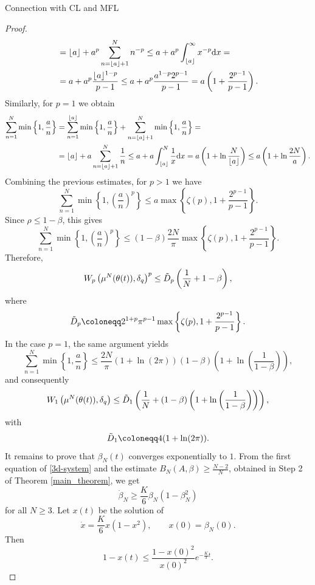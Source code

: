 \documentclass{article}
\theoremstyle{definition}
\newcommand{\jump}{\hfill\break}
\renewcommand{\d}{\textnormal{d}}
\begin{document}
\begin{section}{Connection with CL and MFL}
\begin{proof}
\begin{align*}
           &=\lfloor a\rfloor +a^p\sum_{n=\lfloor a\rfloor+1}^N n^{-p}\leq a+a^p\int_{\lfloor a\rfloor}^\infty x^{-p}\d x=\\
           &=a+a^p\frac{\lfloor a \rfloor^{1-p}}{p-1}\leq a+a^p\frac{a^{1-p}2^{p-1}}{p-1}= a\left(1+\frac{2^{p-1}}{p-1}\right).
        \end{align*}
        Similarly, for $p=1$ we obtain
        \begin{align*}
            \sum_{n=1}^N\min\left\{1,\frac{a}{n}\right\}&=\sum_{n=1}^{\lfloor a\rfloor}\min\left\{1,\frac{a}{n}\right\}+\sum_{n=\lfloor a\rfloor+1}^N\min\left\{1,\frac{a}{n}\right\}=\\
            &=\lfloor a\rfloor +a\sum_{n=\lfloor a\rfloor+1}^N \frac{1}{n}\leq a+a\int_{\lfloor a\rfloor}^N \frac{1}{x}\d x=a\left(1+\ln\frac{N}{\lfloor a\rfloor}\right)\leq a\left(1+\ln\frac{2N}{a}\right).
        \end{align*}
        Combining the previous estimates, for $p>1$ we have
        $$ \sum_{n=1}^N \min\left\{1,\left(\frac{a}{n}\right)^p\right\} \leq a\max\left\{\zeta(p),1+\frac{2^{p-1}}{p-1}\right\}. $$
        Since $\rho\leq1-\beta$, this gives 
        $$ \sum_{n=1}^N \min\left\{1,\left(\frac{a}{n}\right)^p\right\} \leq (1-\beta)\frac{2N}{\pi} \max\left\{\zeta(p),1+\frac{2^{p-1}}{p-1}\right\}. $$
        Therefore,
        $$ W_p\left(\mu^N(\theta(t)),\delta_q\right)^p \leq \Tilde{D}_p \left( \frac{1}{N} + 1-\beta \right), $$
        where
        $$ \Tilde{D}_p\coloneqq 2^{1+p}\pi^{p-1} \max\left\{\zeta(p),1+\frac{2^{p-1}}{p-1}\right\}. $$
        In the case $p=1$, the same argument yields
        $$ \sum_{n=1}^N \min\left\{1,\frac{a}{n}\right\} \leq \frac{2N}{\pi} \left(1+\ln(2\pi)\right) (1-\beta) \left( 1+\ln\left(\frac{1}{1-\beta}\right) \right), $$
        and consequently
        $$ W_1\left(\mu^N(\theta(t)),\delta_q\right) \leq \Tilde{D}_1 \left( \frac{1}{N} + (1-\beta) \left( 1+\ln\left(\frac{1}{1-\beta}\right) \right) \right), $$
        with
        $$ \Tilde{D}_1\coloneqq4(1+\ln(2\pi)). $$\jump\noindent {} It remains to prove that $\beta_N(t)$ converges exponentially to $1$. From the first equation of \eqref{3d-system} and the estimate $B_N(A,\beta)\geq\frac{N-2}{N}$, obtained in Step 2 of Theorem \ref{main_theorem}, we get $$ \dot{\beta}_N \geq \frac{K}{6}\beta_N(1-\beta_N^2) $$ for all $N\geq3$. Let $x(t)$ be the solution of
        $$ \dot{x} = \frac{K}{6}x(1-x^2), \qquad x(0)=\beta_N(0). $$
        Then
        $$ 1-x(t) \leq \frac{1-x(0)^2}{x(0)^2} e^{-\frac{K}{3}t}. $$

\end{proof}
\end{section}
\end{document}
